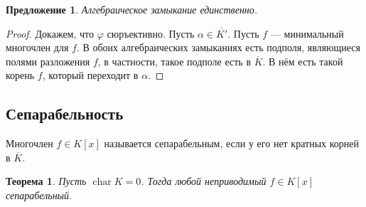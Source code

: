 \documentclass[a4paper]{article}
\let\temp\phi
\let\phi\varphi
\let\varphi\temp
\DeclareMathOperator{\chr}{char}
\newtheorem{theorem}{Теорема}
\numberwithin{theorem}{section}
\numberwithin{lemma}{section}
\newtheorem{proposition}{Предложение}
\numberwithin{proposition}{section}
\numberwithin{corollary}{section}
\begin{document}
\begin{proposition}
Алгебраическое замыкание единственно.
\end{proposition}
\begin{proof}
\begin{minipage}{0.15\linewidth}
\end{minipage}
\begin{minipage}{0.63\linewidth}
Докажем, что $\phi$ сюръективно. Пусть $\alpha \in \overline{K'}$.
Пусть $f$ --- минимальный многочлен для $f$. В обоих алгебраических
замыканиях есть подполя, являющиеся полями разложения $f$, в частности,
такое подполе есть в $\overline{K}$. В нём есть такой корень $f$,
который переходит в $\alpha$.
\end{minipage}
\end{proof}

\subsection*{Сепарабельность}

Многочлен $f \in K[x]$ называется $\textbf{сепарабельным}$,
если у его нет кратных корней в $\overline{K}$.
\begin{theorem}
Пусть $\chr K = 0$. Тогда любой неприводимый $f \in K[x]$ сепарабельный.
\end{theorem}
\end{document}
